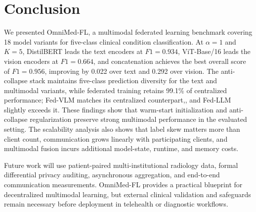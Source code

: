 \section{Conclusion}

We presented OmniMed-FL, a multimodal federated learning benchmark covering 18
model variants for five-class clinical condition classification. At
$\alpha{=}1$ and $K{=}5$, DistilBERT leads the text encoders at $F1{=}0.934$,
ViT-Base/16 leads the vision encoders at $F1{=}0.664$, and concatenation achieves
the best overall score of $F1{=}0.956$, improving by 0.022 over text and 0.292 over
vision. The anti-collapse stack maintains five-class prediction diversity for the
text and multimodal variants, while federated training retains 99.1\% of
centralized performance; Fed-VLM matches its centralized counterpart,, and Fed-LLM
slightly exceeds it. These findings show that warm-start initialization and
anti-collapse regularization preserve strong multimodal performance in the
evaluated setting. The scalability analysis also shows that label skew matters
more than client count, communication grows linearly with participating clients,
and multimodal fusion incurs additional model-state, runtime, and memory costs.


Future work will use patient-paired multi-institutional radiology data, formal
differential privacy auditing, asynchronous aggregation, and end-to-end
communication measurements. OmniMed-FL provides a practical blueprint for
decentralized multimodal learning, but external clinical validation and safeguards
remain necessary before deployment in telehealth or diagnostic workflows.
